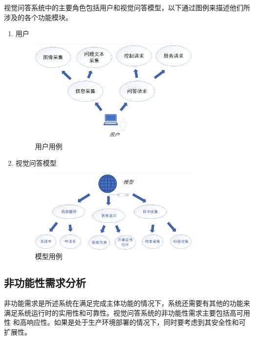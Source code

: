 视觉问答系统中的主要角色包括用户和视觉问答模型，以下通过图例来描述他们所涉及的各个功能模块。
\begin{enumerate}[topsep = 0 pt, itemsep= 0 pt, parsep=0pt, partopsep=0pt, leftmargin=44pt, itemindent=0pt, labelsep=6pt, label=(\arabic*)]
    \item 用户
    \begin{figure}[htbp]
        \centering	
        \includegraphics[width=0.8\textwidth]{Fig/myfig/chapter5/eg_user.png}  %
        \caption{\label{eg_user}用户用例} 
    \end{figure}
    \item 视觉问答模型
    \begin{figure}[htbp]
        \centering	
        \includegraphics[width=0.8\textwidth]{Fig/myfig/chapter5/eg_model.png}  %
        \caption{\label{eg_model}模型用例} 
    \end{figure}
\end{enumerate}

\subsection{非功能性需求分析}
非功能需求是所述系统在满足完成主体功能的情况下，系统还需要有其他的功能来满足系统运行时的实用性和可靠性。视觉问答系统的非功能性需求主要包括高可用性
和高响应性。如果是处于生产环境部署的情况下，同时要考虑到其安全性和可扩展性。

